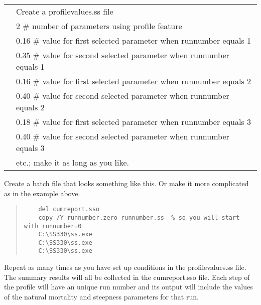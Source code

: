 	\begin{longtable}{p{0.5cm} p{16cm}}		
		& Create a profilevalues.ss file\\
		& 2	\# number of parameters using profile feature\\
		& 0.16	\# value for first selected parameter when runnumber equals 1\\
		& 0.35	\# value for second selected parameter when runnumber equals 1\\
		& 0.16	\# value for first selected parameter when runnumber equals 2\\
		& 0.40	\# value for second selected parameter when runnumber equals 2\\
		& 0.18	\# value for first selected parameter when runnumber equals 3\\
		& 0.40	\# value for second selected parameter when runnumber equals 3\\
		& etc.;  make it as long as you like.\\
	\end{longtable}

Create a batch file that looks something like this.  Or make it more complicated as in the example above.


\begin{quote}
\begin{verbatim}
	del cumreport.sso
	copy /Y runnumber.zero runnumber.ss  % so you will start with runnumber=0 
	C:\SS330\ss.exe 
	C:\SS330\ss.exe 
	C:\SS330\ss.exe 
\end{verbatim}
\end{quote}


Repeat as many times as you have set up conditions in the profilevalues.ss file.
The summary results will all be collected in the cumreport.sso file.  Each step of the profile will have an unique run number and its output will include the values of the natural mortality and steepness parameters for that run.

